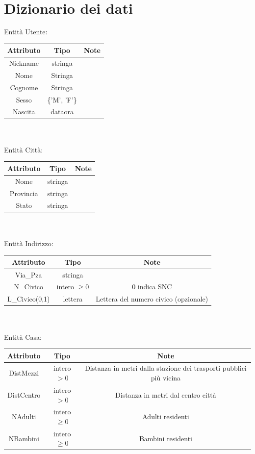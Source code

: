 \documentclass[a4paper,12pt]{report}
\begin{document}
    \chapter{Dizionario dei dati}
      Entità Utente: \\
      \begin{tabular}{|c|c|c|}
        \hline Attributo & Tipo & Note \\
        \hline Nickname & stringa & \\
        \hline Nome & Stringa & \\
        \hline Cognome & Stringa & \\
        \hline Sesso & \{'M', 'F'\} & \\
        \hline Nascita & dataora & \\
        \hline
      \end{tabular} \\
      \vspace{24pt} \\
      Entità Città: \\
      \begin{tabular}{|c|c|c|}
        \hline Attributo & Tipo & Note \\
        \hline Nome & stringa & \\
        \hline Provincia & stringa & \\
        \hline Stato & stringa & \\
        \hline
      \end{tabular} \\
      \vspace{24pt} \\
      Entità Indirizzo: \\
      \begin{tabular}{|c|c|c|}
        \hline Attributo & Tipo & Note \\
        \hline Via\_Pza & stringa & \\
        \hline N\_Civico & intero \(\geq 0\) & 0 indica SNC \\
        \hline L\_Civico(0,1) & lettera & Lettera del numero civico (opzionale) \\
        \hline
      \end{tabular} \\
      \vspace{24pt} \\
      Entità Casa: \\
      \begin{tabular}{|c|c|c|}
        \hline Attributo & Tipo & Note \\
        \hline DistMezzi & intero \(> 0\) & Distanza in metri dalla stazione dei trasporti pubblici più vicina \\
        \hline DistCentro & intero \(> 0\) & Distanza in metri dal centro città \\
        \hline NAdulti & intero \(\geq 0\) & Adulti residenti \\
        \hline NBambini & intero \(\geq 0\) & Bambini residenti \\
        \hline
      \end{tabular} \\
\end{document}
